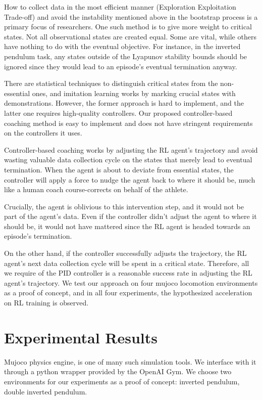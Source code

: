 \documentclass[AMS,STIX1COL]{WileyNJD-v2}
\begin{document}
How to collect data in the most efficient manner (Exploration Exploitation Trade-off) and avoid the instability mentioned above in the bootstrap process is a primary focus of researchers. One such method is to give more weight to critical states. Not all observational states are created equal. Some are vital, while others have nothing to do with the eventual objective. For instance, in the inverted pendulum task, any states outside of the Lyapunov stability bounds should be ignored since they would lead to an episode's eventual termination anyway. 

There are statistical techniques to distinguish critical states from the non-essential ones, and imitation learning works by marking crucial states with demonstrations. However, the former approach is hard to implement, and the latter one requires high-quality controllers. Our proposed controller-based coaching method is easy to implement and does not have stringent requirements on the controllers it uses.

Controller-based coaching works by adjusting the RL agent's trajectory and avoid wasting valuable data collection cycle on the states that merely lead to eventual termination. When the agent is about to deviate from essential states, the controller will apply a force to nudge the agent back to where it should be, much like a human coach course-corrects on behalf of the athlete. 

Crucially, the agent is oblivious to this intervention step, and it would not be part of the agent's data. Even if the controller didn't adjust the agent to where it should be, it would not have mattered since the RL agent is headed towards an episode's termination. 

On the other hand, if the controller successfully adjusts the trajectory, the RL agent's next data collection cycle will be spent in a critical state. Therefore, all we require of the PID controller is a reasonable success rate in adjusting the RL agent's trajectory. We test our approach on four mujoco locomotion environments as a proof of concept, and in all four experiments, the hypothesized acceleration on RL training is observed.

\section{Experimental Results}
Mujoco physics engine\citet{6386109}, is one of many such simulation tools. We interface with it through a python wrapper provided by the OpenAI Gym\citet{Brockman2016OpenAIG}. We choose two environments for our experiments as a proof of concept: inverted pendulum, double inverted pendulum. 
\end{document}
